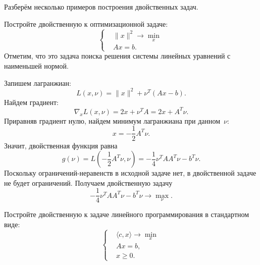 \documentclass[12pt,fleqn]{article}
\begin{document}
Разберём несколько примеров построения двойственных задач.

\begin{vkProblem}
    Постройте двойственную к оптимизационной задаче:
    \[
        \left\{
            \begin{aligned}
                & \|x\|^2 \to \min_{x} \\
                & Ax = b.
            \end{aligned}
        \right.
    \]
    Отметим, что это задача поиска решения системы линейных уравнений
    с наименьшей нормой.
\end{vkProblem}

\begin{esSolution}
    Запишем лагранжиан:
    \[
        L(x, \nu)
        =
        \|x\|^2
        +
        \nu^T (Ax - b).
    \]
    Найдем градиент:
    \[
        \nabla_x L(x, \nu)
        =
        2x + \nu^T A
        =
        2x + A^T \nu.
    \]
    Приравняв градиент нулю, найдем минимум лагранжиана при данном~$\nu$:
    \[
        x = -\frac{1}{2} A^T \nu.
    \]
    Значит, двойственная функция равна
    \[
        g(\nu)
        =
        L \left(-\frac{1}{2} A^T \nu, \nu \right)
        =
        -\frac{1}{4} \nu^T A A^T \nu - b^T \nu.
    \]
    Поскольку ограничений-неравенств в исходной задаче нет,
    в двойственной задаче не будет ограничений.
    Получаем двойственную задачу
    \[
        -\frac{1}{4} \nu^T A A^T \nu - b^T \nu \to  \max_\nu.
    \]
\end{esSolution}

\begin{vkProblem}
    Постройте двойственную к задаче линейного программирования в стандартном виде:
    \[
        \left\{
            \begin{aligned}
                & \langle c, x \rangle \to \min_{x} \\
                & Ax = b, \\
                & x \geq 0.
            \end{aligned}
        \right.
    \]
\end{vkProblem}
\end{document}
